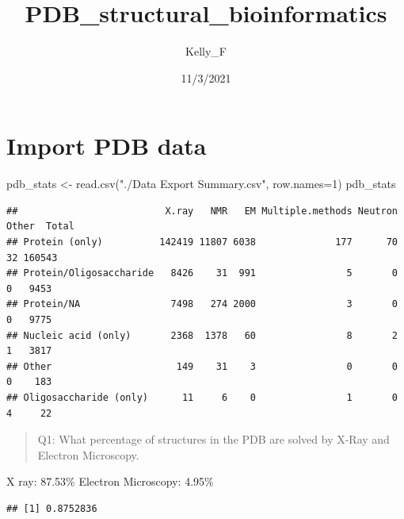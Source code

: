 \documentclass[
]{article}
\title{PDB\_structural\_bioinformatics}
\author{Kelly\_F}
\date{11/3/2021}
\newenvironment{Shaded}{\begin{snugshade}}{\end{snugshade}}
\newcommand{\AttributeTok}[1]{\textcolor[rgb]{0.77,0.63,0.00}{#1}}
\newcommand{\CommentTok}[1]{\textcolor[rgb]{0.56,0.35,0.01}{\textit{#1}}}
\newcommand{\DecValTok}[1]{\textcolor[rgb]{0.00,0.00,0.81}{#1}}
\newcommand{\FunctionTok}[1]{\textcolor[rgb]{0.00,0.00,0.00}{#1}}
\newcommand{\NormalTok}[1]{#1}
\newcommand{\OtherTok}[1]{\textcolor[rgb]{0.56,0.35,0.01}{#1}}
\newcommand{\SpecialCharTok}[1]{\textcolor[rgb]{0.00,0.00,0.00}{#1}}
\newcommand{\StringTok}[1]{\textcolor[rgb]{0.31,0.60,0.02}{#1}}
\begin{document}
\maketitle

\hypertarget{import-pdb-data}{%
\section{Import PDB data}\label{import-pdb-data}}

\begin{Shaded}
\begin{Highlighting}[]
\NormalTok{pdb\_stats }\OtherTok{\textless{}{-}} \FunctionTok{read.csv}\NormalTok{(}\StringTok{"./Data Export Summary.csv"}\NormalTok{, }\AttributeTok{row.names=}\DecValTok{1}\NormalTok{)}
\NormalTok{pdb\_stats}
\end{Highlighting}
\end{Shaded}

\begin{verbatim}
##                          X.ray   NMR   EM Multiple.methods Neutron Other  Total
## Protein (only)          142419 11807 6038              177      70    32 160543
## Protein/Oligosaccharide   8426    31  991                5       0     0   9453
## Protein/NA                7498   274 2000                3       0     0   9775
## Nucleic acid (only)       2368  1378   60                8       2     1   3817
## Other                      149    31    3                0       0     0    183
## Oligosaccharide (only)      11     6    0                1       0     4     22
\end{verbatim}

\begin{quote}
Q1: What percentage of structures in the PDB are solved by X-Ray and
Electron Microscopy.
\end{quote}

X ray: 87.53\% Electron Microscopy: 4.95\%

\begin{Shaded}
\end{Shaded}

\begin{verbatim}
## [1] 0.8752836
\end{verbatim}
\end{document}
